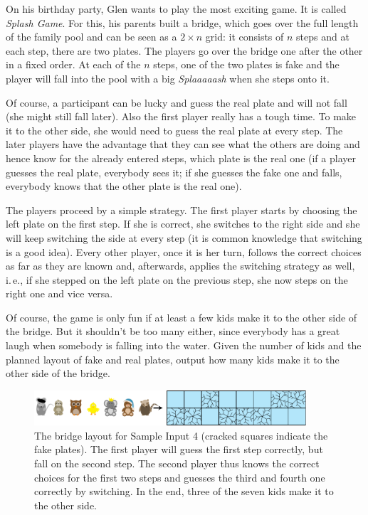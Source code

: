 
On his birthday party, Glen wants to play the most exciting game. It
is called \emph{Splash Game}. For this, his parents built a bridge, which goes
over the full length of the family pool and can be seen as a $2 \times
n$ grid: it consists of $n$ steps and at each step, there are two
plates. The players go over the bridge one after the other in a fixed
order. At each of the $n$ steps, one of the two plates is fake and
the player will fall into the pool with a big \emph{Splaaaaash} when
she steps onto it.

Of course, a participant can be lucky and guess the real plate and
will not fall (she might still fall later). Also the first
player really has a tough time. To make it to the other side, she would
need to guess the real plate at every step. The later players have
the advantage that they can see
what the others are doing and hence know for the already entered
steps, which plate is the real one (if a player guesses the real
plate, everybody sees it; if she guesses the fake one and falls, everybody knows
that the other plate is the real one).

The players proceed by a simple strategy. The first player
starts by choosing the left plate on the first step. If she is correct,
she switches to the right side and she will keep switching the side at
every step (it is common knowledge that switching is a good
idea). Every other player, once it is her turn, follows
the correct choices as far as they are known and, afterwards, applies
the switching strategy as well, i.\,e., if she stepped on the left
plate on the previous step, she now steps on the right one and vice versa.

Of course, the game is only fun if at least a few kids make it to the
other side of the bridge. But it shouldn't be too many either, since everybody
has a great laugh when somebody is falling into the water. Given the
number of kids and the planned layout of fake and real plates,
output how many kids make it to the other side of the bridge.

\begin{figure}[ht!]
\centering
\includegraphics[width=0.9\textwidth]{sample}

\caption{The bridge layout for Sample Input 4 (cracked squares indicate
  the fake plates). The first player will
  guess the first step correctly, but fall on the second step. The
  second player thus knows the correct choices for the first two steps
  and guesses the third and fourth one correctly by switching. In the
  end, three of the seven kids make it to the other side.}
\end{figure}


